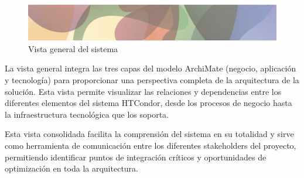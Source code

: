 
\begin{figure}[H]
	\centering
	\includegraphics[width=\textwidth]{images/placeholder.png}
	\caption{Vista general del sistema}
	\label{fig:vista-general}
\end{figure}

La vista general integra las tres capas del modelo ArchiMate (negocio, aplicación y tecnología) para proporcionar una perspectiva completa de la arquitectura de la solución. Esta vista permite visualizar las relaciones y dependencias entre los diferentes elementos del sistema HTCondor, desde los procesos de negocio hasta la infraestructura tecnológica que los soporta.

Esta vista consolidada facilita la comprensión del sistema en su totalidad y sirve como herramienta de comunicación entre los diferentes stakeholders del proyecto, permitiendo identificar puntos de integración críticos y oportunidades de optimización en toda la arquitectura.
